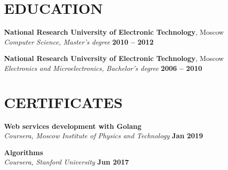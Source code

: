 \documentclass[margin,line]{resume}
\begin{document}
\begin{resume}
\sectionline

    \section{\mysidestyle \textbf{\large{E}\small{DUCATION}}}

    \textbf{\listing National Research University of Electronic Technology}, Moscow \vspace{2mm}\\\vspace{1mm}%
    \textsl{Computer Science, Master's degree} \hfill \textbf{2010 -- 2012}\vspace{-3mm}\\\vspace{-1mm}%
    \vspace{-1.5mm}

    \textbf{\listing National Research University of Electronic Technology}, Moscow \vspace{2mm}\\\vspace{1mm}%
    \textsl{Electronics and Microelectronics, Bachelor's degree} \hfill \textbf{2006 -- 2010}\vspace{-3mm}\\\vspace{-1mm}%
    \vspace{-1.5mm}

\sectionline

    \section{\mysidestyle \textbf{\large{C}\small{ERTIFICATES}}}

    \textbf{\listing Web services development with Golang} \vspace{2mm}\\\vspace{1mm}%
    \textsl{Coursera, Moscow Institute of Physics and Technology} \hfill \textbf{Jan 2019}\vspace{-3mm}\\\vspace{-1mm}%
    \vspace{-1.5mm}

    \textbf{\listing Algorithms} \vspace{2mm}\\\vspace{1mm}%
    \textsl{Coursera, Stanford University} \hfill \textbf{Jun 2017}\vspace{-3mm}\\\vspace{-1mm}%
    \vspace{-1.5mm}

\sectionline


\end{resume}
\end{document}
